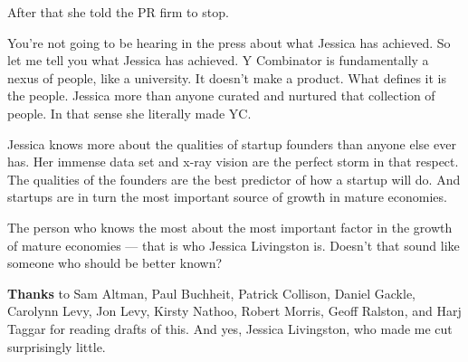 After that she told the PR firm to stop.

You're not going to be hearing in the press about what Jessica has
achieved. So let me tell you what Jessica has achieved. Y Combinator is
fundamentally a nexus of people, like a university. It doesn't make a
product. What defines it is the people. Jessica more than anyone curated
and nurtured that collection of people. In that sense she literally made
YC.

Jessica knows more about the qualities of startup founders than anyone
else ever has. Her immense data set and x-ray vision are the perfect
storm in that respect. The qualities of the founders are the best
predictor of how a startup will do. And startups are in turn the most
important source of growth in mature economies.

The person who knows the most about the most important factor in the
growth of mature economies --- that is who Jessica Livingston is.
Doesn't that sound like someone who should be better known?


\textbf{Thanks} to Sam Altman, Paul Buchheit, Patrick Collison, Daniel
Gackle, Carolynn Levy, Jon Levy, Kirsty Nathoo, Robert Morris, Geoff
Ralston, and Harj Taggar for reading drafts of this. And yes, Jessica
Livingston, who made me cut surprisingly little.